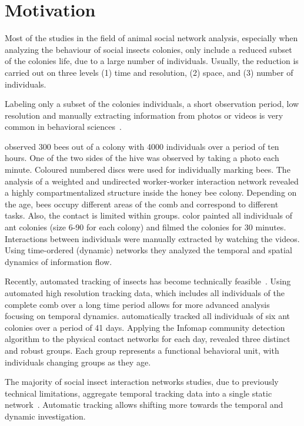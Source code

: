\section{Motivation}
Most of the studies in the field of animal social network analysis, especially when analyzing the behaviour of social insects colonies, only include a reduced subset of the colonies life, due to a large number of individuals. Usually, the reduction is carried out on three levels (1) time and resolution, (2) space, and (3) number of individuals.

Labeling only a subset of the colonies individuals, a short observation period, low res\-olution and manually extracting information from photos or videos is very common in behavioral sciences~\cite{naug2008structure, quevillon2015social}.

\textcite{baracchi2014socio} observed 300 bees out of a colony with 4000 individuals over a period of ten hours. One of the two sides of the hive was observed by taking a photo each minute. Coloured numbered discs were used for individually marking bees. The analysis of a weighted and undirected worker-worker interaction network revealed a highly compartmentalized structure inside the honey bee colony. Depending on the age, bees occupy different areas of the comb and correspond to different tasks. Also, the contact is limited within groups. \textcite{blonder2011time} color painted all individuals of ant colonies (size 6-90 for each colony) and filmed the colonies for 30 minutes. Interactions between individuals were manually extracted by watching the videos. Using time-ordered (dynamic) networks they analyzed the temporal and spatial dynamics of information flow.

Recently, automated tracking of insects has become technically feasible~\cite{wario2015automatic, crall2015beetag, fiala2005comparing}.
Using automated high resolution tracking data, which includes all individuals of the complete comb over a long time period allows for more advanced analysis focusing on temporal dynamics.
\textcite{mersch2013tracking} automatically tracked all individuals of six ant colonies over a period of 41 days. Applying the Infomap community detection algorithm to the physical contact networks for each day, revealed three distinct and robust groups. Each group represents a functional behavioral unit, with individuals changing groups as they age.

The majority of social insect interaction networks studies, due to previously technical limitations, aggregate temporal tracking data into a single static network~\cite[Chapter~15]{krause2014animal}.
Automatic tracking allows shifting more towards the temporal and dynamic investigation.


